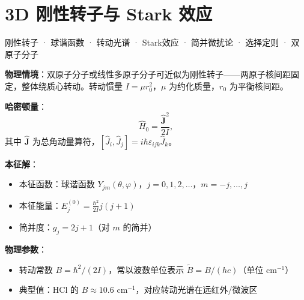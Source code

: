 
\section{3D 刚性转子与 Stark 效应}
\label{sec:rigid-rotor-3d}

\begin{tipbox}[关键词标签]
刚性转子 · 球谐函数 · 转动光谱 · Stark效应 · 简并微扰论 · 选择定则 · 双原子分子
\end{tipbox}

\begin{modelbox}[模型：三维空间中的刚性转子]
\textbf{物理情境}：双原子分子或线性多原子分子可近似为刚性转子——两原子核间距固定，整体绕质心转动。转动惯量 $I=\mu r_0^2$，$\mu$ 为约化质量，$r_0$ 为平衡核间距。

\textbf{哈密顿量}：
\[
\hat H_0=\frac{\hat{\mathbf{J}}^2}{2I},
\]
其中 $\hat{\mathbf{J}}$ 为总角动量算符，$[\hat J_i,\hat J_j]=i\hbar\varepsilon_{ijk}\hat J_k$。

\textbf{本征解}：
\begin{itemize}[nosep]
    \item 本征函数：球谐函数 $Y_{jm}(\theta,\varphi)$，$j=0,1,2,\ldots$，$m=-j,\ldots,j$
    \item 本征能量：$\displaystyle E_j^{(0)}=\frac{\hbar^2}{2I}j(j+1)$
    \item 简并度：$g_j=2j+1$（对 $m$ 的简并）
\end{itemize}

\textbf{物理参数}：
\begin{itemize}[nosep]
    \item 转动常数 $B=\hbar^2/(2I)$，常以波数单位表示 $\tilde B=B/(hc)$（单位 cm$^{-1}$）
    \item 典型值：HCl 的 $B\approx10.6$ cm$^{-1}$，对应转动光谱在远红外/微波区
\end{itemize}
\end{modelbox}

